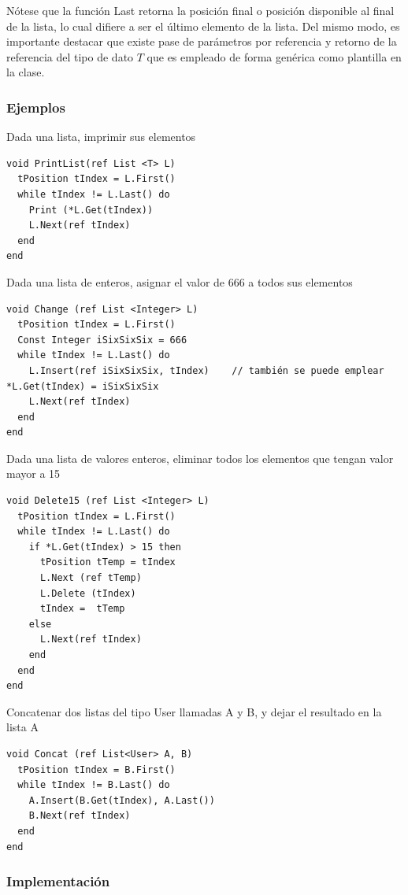 Nótese que la función Last retorna la posición final o posición disponible al final de la lista, lo cual difiere a ser el último elemento de la lista. Del mismo modo, es importante destacar que existe pase de parámetros por referencia y retorno de la referencia del tipo de dato $T$ que es empleado de forma genérica como plantilla en la clase.

\subsubsection{Ejemplos}

Dada una lista, imprimir sus elementos
\begin{lstlisting}[upquote=true, language=pseudo]
void PrintList(ref List <T> L)
  tPosition tIndex = L.First()
  while tIndex != L.Last() do
    Print (*L.Get(tIndex))
    L.Next(ref tIndex)
  end
end
\end{lstlisting}

Dada una lista de enteros, asignar el valor de 666 a todos sus elementos
\begin{lstlisting}[upquote=true, language=pseudo]
void Change (ref List <Integer> L)
  tPosition tIndex = L.First()
  Const Integer iSixSixSix = 666
  while tIndex != L.Last() do
    L.Insert(ref iSixSixSix, tIndex) 	// también se puede emplear *L.Get(tIndex) = iSixSixSix
    L.Next(ref tIndex)
  end
end
\end{lstlisting}

Dada una lista de valores enteros, eliminar todos los elementos que tengan valor mayor a 15
\begin{lstlisting}[upquote=true, language=pseudo]
void Delete15 (ref List <Integer> L)
  tPosition tIndex = L.First()
  while tIndex != L.Last() do
    if *L.Get(tIndex) > 15 then
      tPosition tTemp = tIndex
      L.Next (ref tTemp)
      L.Delete (tIndex)
      tIndex =  tTemp
    else
      L.Next(ref tIndex)
    end
  end
end
\end{lstlisting}

Concatenar dos listas del tipo User llamadas A y B, y dejar el resultado en la lista A
\begin{lstlisting}[upquote=true, language=pseudo]
void Concat (ref List<User> A, B)
  tPosition tIndex = B.First()
  while tIndex != B.Last() do
    A.Insert(B.Get(tIndex), A.Last())
    B.Next(ref tIndex)
  end
end
\end{lstlisting}

\subsubsection{Implementación}

